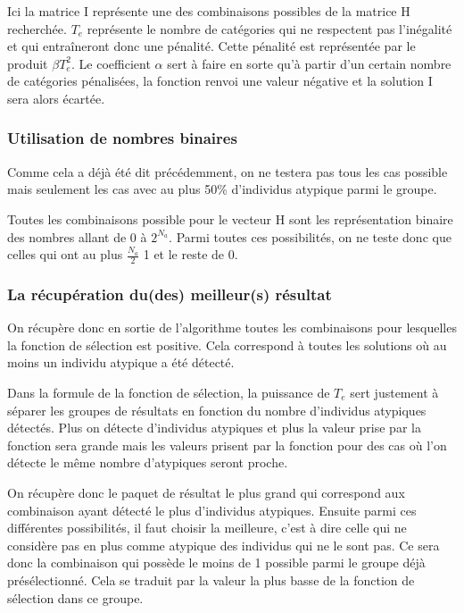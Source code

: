 \documentclass[a4paper, 11pt]{article}
\begin{document}
Ici la matrice I représente une des combinaisons possibles de la matrice H recherchée. $T_e$ représente le nombre de catégories qui ne respectent pas l'inégalité et qui entraîneront donc une pénalité. Cette pénalité est représentée par le produit $\beta T_e^2$. Le coefficient $\alpha$ sert à faire en sorte qu'à partir d'un certain nombre de catégories pénalisées, la fonction renvoi une valeur négative et la solution I sera alors écartée. 

\subsubsection{Utilisation de nombres binaires}

Comme cela a déjà été dit précédemment, on ne testera pas tous les cas possible mais seulement les cas avec au plus 50\% d'individus atypique parmi le groupe.

Toutes les combinaisons possible pour le vecteur H sont les représentation binaire des nombres allant de 0 à $2^{N_a}$. Parmi toutes ces possibilités, on ne teste donc que celles qui ont au plus $\frac{N_a}{2}$ 1 et le reste de 0.

\subsubsection{La récupération du(des) meilleur(s) résultat}

On récupère donc en sortie de l'algorithme toutes les combinaisons pour lesquelles la fonction de sélection est positive. Cela correspond à toutes les solutions où au moins un individu atypique a été détecté. 

Dans la formule de la fonction de sélection, la puissance de $T_e$ sert justement à séparer les groupes de résultats en fonction du nombre d'individus atypiques détectés. Plus on détecte d'individus atypiques et plus la valeur prise par la fonction sera grande mais les valeurs prisent par la fonction pour des cas où l'on détecte le même nombre d'atypiques seront proche.

On récupère donc le paquet de résultat le plus grand qui correspond aux combinaison ayant détecté le plus d'individus atypiques. Ensuite parmi ces différentes possibilités, il faut choisir la meilleure, c'est à dire celle qui ne considère pas en plus comme atypique des individus qui ne le sont pas. Ce sera donc la combinaison qui possède le moins de 1 possible parmi le groupe déjà présélectionné. Cela se traduit par la valeur la plus basse de la fonction de sélection dans ce groupe.
\end{document}
